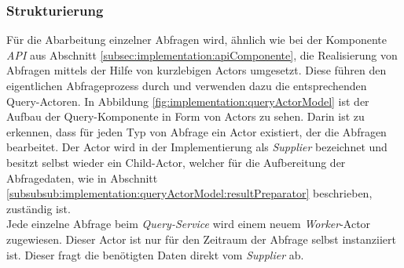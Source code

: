 \subsubsection{Strukturierung}
Für die Abarbeitung einzelner Abfragen wird, ähnlich wie bei der Komponente \textit{API} aus Abschnitt \ref{subsec:implementation:apiComponente}, die Realisierung von Abfragen mittels der Hilfe von kurzlebigen Actors umgesetzt. Diese führen den eigentlichen Abfrageprozess durch und verwenden dazu die entsprechenden Query-Actoren. In Abbildung \ref{fig:implementation:queryActorModel} ist der Aufbau der Query-Komponente in Form von Actors zu sehen. Darin ist zu erkennen, dass für jeden Typ von Abfrage ein Actor existiert, der die Abfragen bearbeitet. 
Der Actor wird in der Implementierung als \textit{Supplier} bezeichnet und besitzt selbst wieder ein Child-Actor, welcher für die Aufbereitung der Abfragedaten, wie in Abschnitt \ref{subsubsub:implementation:queryActorModel:resultPreparator} beschrieben, zuständig ist. \\
Jede einzelne Abfrage beim \textit{Query-Service} wird einem neuem \textit{Worker}-Actor zugewiesen. Dieser Actor ist nur für den Zeitraum der Abfrage selbst instanziiert ist. Dieser fragt die benötigten Daten direkt vom \textit{Supplier} ab. 













